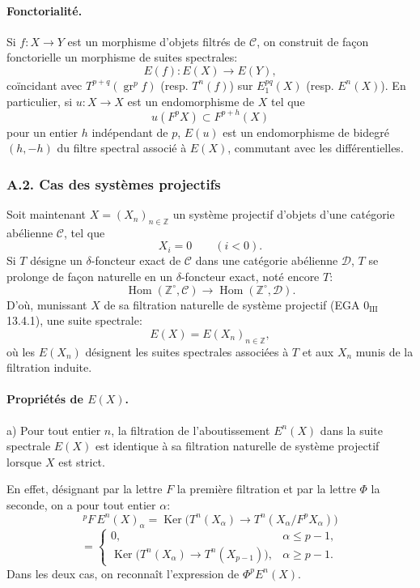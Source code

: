 \documentclass[11pt]{article}
\DeclareMathOperator{\Hom}{Hom}
\providecommand{\Ker}{\operatorname{Ker}}
\providecommand{\gr}{\operatorname{gr}}
\providecommand{\Hom}{\operatorname{Hom}}
\providecommand{\Ker}{\operatorname{Ker}}
\providecommand{\gr}{\operatorname{gr}}
\providecommand{\gr}{\operatorname{gr}}
\providecommand{\Ker}{\operatorname{Ker}}
\providecommand{\Hom}{\operatorname{Hom}}
\begin{document}
\paragraph{Fonctorialité.}
Si \(f:X\to Y\) est un morphisme d'objets filtrés de \(\mathcal C\), on construit de façon fonctorielle un morphisme de suites spectrales:
\[
E(f):E(X)\longrightarrow E(Y),
\]
coïncidant avec \(T^{p+q}(\gr^p f)\) (resp. \(T^n(f)\)) sur \(E_1^{pq}(X)\) (resp. \(E^n(X)\)). En particulier, si \(u:X\to X\) est un endomorphisme de \(X\) tel que
\[
u(F^pX)\subset F^{p+h}(X)
\]
pour un entier \(h\) indépendant de \(p\), \(E(u)\) est un endomorphisme de bidegré \((h,-h)\) du filtre spectral associé à \(E(X)\), commutant avec les différentielles.

\subsubsection*{A.2. Cas des systèmes projectifs}
Soit maintenant \(X=(X_n)_{n\in\mathbb Z}\) un système projectif d'objets d'une catégorie abélienne \(\mathcal C\), tel que
\[
X_i=0\qquad(i<0).
\]
Si \(T\) désigne un \(\delta\)-foncteur exact de \(\mathcal C\) dans une catégorie abélienne \(\mathcal D\), \(T\) se prolonge de façon naturelle en un \(\delta\)-foncteur exact, noté encore \(T\):
\[
\Hom(\mathbb Z^\circ,\mathcal C)\longrightarrow \Hom(\mathbb Z^\circ,\mathcal D).
\]
D'où, munissant \(X\) de sa filtration naturelle de système projectif (EGA \(0_{\mathrm{III}}\) 13.4.1), une suite spectrale:
\[
E(X)=E(X_n)_{n\in\mathbb Z},
\]
où les \(E(X_n)\) désignent les suites spectrales associées à \(T\) et aux \(X_n\) munis de la filtration induite.

\paragraph{Propriétés de \(E(X)\).}
a) Pour tout entier \(n\), la filtration de l'aboutissement \(E^n(X)\) dans la suite spectrale \(E(X)\) est identique à sa filtration naturelle de système projectif lorsque \(X\) est strict.

En effet, désignant par la lettre \(F\) la première filtration et par la lettre \(\Phi\) la seconde, on a pour tout entier \(\alpha\):
\[
{}^pF\,E^n(X)_\alpha
=\Ker\bigl(T^n(X_\alpha)\longrightarrow T^n(X_\alpha/F^pX_\alpha)\bigr)
\]
\[
=
\begin{cases}
0,& \alpha\le p-1,\\
\Ker\bigl(T^n(X_\alpha)\longrightarrow T^n(X_{p-1})\bigr),& \alpha\ge p-1.
\end{cases}
\]
Dans les deux cas, on reconnaît l'expression de \(\Phi^pE^n(X)\).
\end{document}
